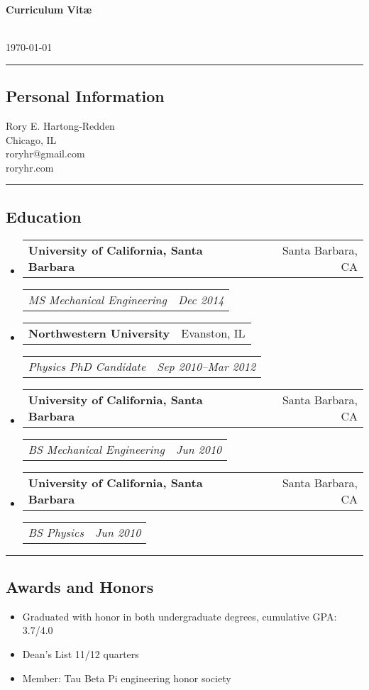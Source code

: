 \documentclass[10pt,letterpaper]{article}
\makeatletter
\newenvironment{indentsection}[1]%
{\begin{list}{}%
	{\setlength{\leftmargin}{#1}}%
	\item[]%
}
{\end{list}}
\newcommand{\headerrow}[2]
	{\begin{tabular*}{\linewidth}{l@{\extracolsep{\fill}}r}
	#1 & #2 
	 \end{tabular*}}
\newcommand{\jobitem}[4]{
	\item \headerrow{\textbf{#1}}{#2}
	\headerrow{\emph{#3}}{\emph{#4}}
}
\makeatother
\begin{document}
{\raggedright \LARGE \bf Curriculum Vit\ae}\\
\today
\newline
\hrule
\subsection*{Personal Information}
\begin{indentsection}{\parindent}
Rory E. Hartong-Redden \\
Chicago, IL   \\
roryhr@gmail.com \\
roryhr.com
\end{indentsection}

\hrule
\subsection*{Education}
\begin{itemize}
	\jobitem{University of California, Santa Barbara}	{Santa Barbara, CA}
			{MS  Mechanical Engineering}			{Dec 2014}
	\jobitem{Northwestern University}					{Evanston, IL}
		    {Physics PhD Candidate}					{Sep 2010--Mar 2012}
	\jobitem{University of California, Santa Barbara}	{Santa Barbara, CA}	
			{BS Mechanical Engineering} 				{Jun 2010}
	\jobitem{University of California, Santa Barbara}	{Santa Barbara, CA}	
			{BS Physics} 								{Jun 2010}
\end{itemize}

\hrule
\subsection*{Awards and Honors}
\begin{indentsection}{\parindent}
	\begin{itemize}
		\parskip=-0.1em
		\item Graduated with honor in both undergraduate degrees, cumulative GPA: 3.7/4.0
		\item Dean's List 11/12 quarters
		\item Member: Tau Beta Pi engineering honor society
	\end{itemize}
\end{indentsection}
\end{document}
